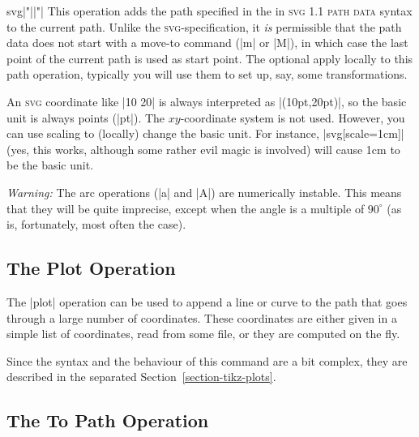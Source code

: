 \begin{pathoperation}{svg}{|"||"|}
  This operation adds the path specified in the  in
  \textsc{svg 1.1 path data} syntax to the current path. Unlike the
  \textsc{svg}-specification, it \emph{is} permissible that the path
  data does not start with a move-to command (|m| or |M|), in which
  case the last point of the current path is used as start point.
  The optional  apply locally to this path operation,
  typically you will use them to set up, say, some transformations.

\begin{codeexample}[]
\end{codeexample}

  An \textsc{svg} coordinate like |10 20| is always interpreted as
  |(10pt,20pt)|, so the basic unit is always points (|pt|). The
  $xy$-coordinate system is not used. However, you can use scaling to
  (locally) change the basic unit. For instance, |svg[scale=1cm]|
  (yes, this works, although some rather evil magic is involved) will
  cause 1cm to be the basic unit.

  \emph{Warning:} The arc operations (|a| and |A|) are  numerically
  instable. This means that they will be quite imprecise, except when
  the angle is a multiple of $90^\circ$ (as is, fortunately, most
  often the case).
\end{pathoperation}

\subsection{The Plot Operation}

The |plot| operation can be used to append a line or curve to the path
that goes through a large number of coordinates. These coordinates are
either given in a simple list of coordinates, read from some file, or
they are computed on the fly.

Since the syntax and the behaviour of this command are a bit complex,
they are described in the separated Section~\ref{section-tikz-plots}.

\subsection{The To Path Operation}

